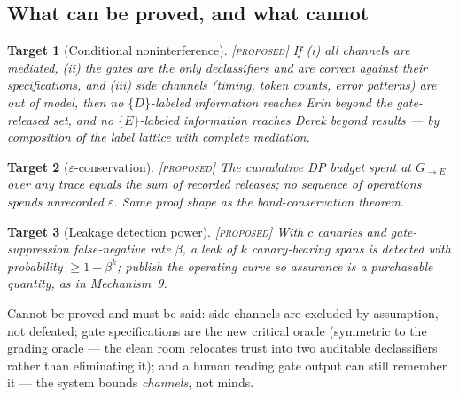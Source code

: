 \documentclass[11pt,a4paper]{article}
\newtheorem{target}{Target}[section]
\theoremstyle{definition}
\theoremstyle{remark}
\newcommand{\grade}[1]{\textsc{[#1]}}
\begin{document}
\subsection{What can be proved, and what cannot}
\begin{target}[Conditional noninterference]\grade{proposed} If (i) all channels are mediated, (ii) the gates are the only declassifiers and are correct against their specifications, and (iii) side channels (timing, token counts, error patterns) are out of model, then no $\{D\}$-labeled information reaches Erin beyond the gate-released set, and no $\{E\}$-labeled information reaches Derek beyond results --- by composition of the label lattice with complete mediation. \end{target}
\begin{target}[$\varepsilon$-conservation]\grade{proposed} The cumulative DP budget spent at $G_{\to E}$ over any trace equals the sum of recorded releases; no sequence of operations spends unrecorded $\varepsilon$. Same proof shape as the bond-conservation theorem. \end{target}
\begin{target}[Leakage detection power]\grade{proposed} With $c$ canaries and gate-suppression false-negative rate $\beta$, a leak of $k$ canary-bearing spans is detected with probability $\ge 1 - \beta^{k}$; publish the operating curve so assurance is a purchasable quantity, as in Mechanism~9. \end{target}
Cannot be proved and must be said: side channels are excluded by assumption, not defeated; gate specifications are the new critical oracle (symmetric to the grading oracle --- the clean room relocates trust into two auditable declassifiers rather than eliminating it); and a human reading gate output can still remember it --- the system bounds \emph{channels}, not minds.
\end{document}
